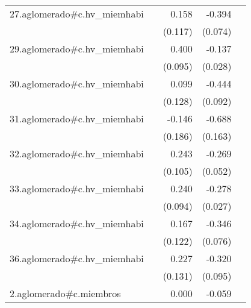 {\begin{longtable}{l*{4}{D{.}{.}{-1}}}
\addlinespace
27.aglomerado#c.hv\_miemhabi&                     &       0.158         &      -0.394\sym{***}&                     \\
            &                     &     (0.117)         &     (0.074)         &                     \\
\addlinespace
29.aglomerado#c.hv\_miemhabi&                     &       0.400\sym{***}&      -0.137\sym{***}&                     \\
            &                     &     (0.095)         &     (0.028)         &                     \\
\addlinespace
30.aglomerado#c.hv\_miemhabi&                     &       0.099         &      -0.444\sym{***}&                     \\
            &                     &     (0.128)         &     (0.092)         &                     \\
\addlinespace
31.aglomerado#c.hv\_miemhabi&                     &      -0.146         &      -0.688\sym{***}&                     \\
            &                     &     (0.186)         &     (0.163)         &                     \\
\addlinespace
32.aglomerado#c.hv\_miemhabi&                     &       0.243\sym{*}  &      -0.269\sym{***}&                     \\
            &                     &     (0.105)         &     (0.052)         &                     \\
\addlinespace
33.aglomerado#c.hv\_miemhabi&                     &       0.240\sym{*}  &      -0.278\sym{***}&                     \\
            &                     &     (0.094)         &     (0.027)         &                     \\
\addlinespace
34.aglomerado#c.hv\_miemhabi&                     &       0.167         &      -0.346\sym{***}&                     \\
            &                     &     (0.122)         &     (0.076)         &                     \\
\addlinespace
36.aglomerado#c.hv\_miemhabi&                     &       0.227         &      -0.320\sym{***}&                     \\
            &                     &     (0.131)         &     (0.095)         &                     \\
\addlinespace
2.aglomerado#c.miembros&                     &       0.000         &      -0.059\sym{***}&                     \\

\end{longtable}}
